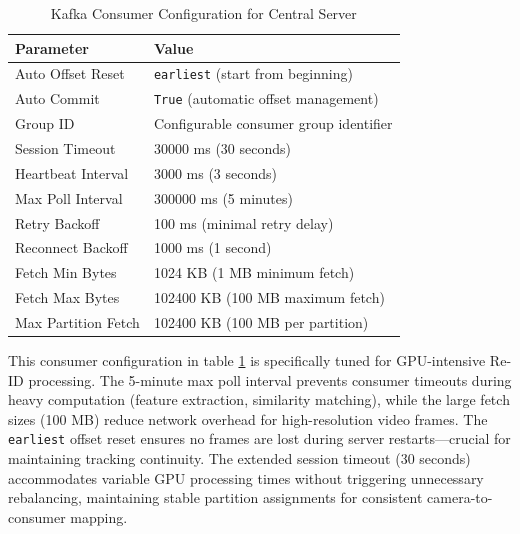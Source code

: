 \begin{table}[!htbp]
\centering
\caption{Kafka Consumer Configuration for Central Server}
\label{tab:consumer_config}
\begin{tabular}{|p{4cm}|p{8cm}|}
\hline
\textbf{Parameter} & \textbf{Value} \\
\hline
Auto Offset Reset & \texttt{earliest} (start from beginning) \\
Auto Commit & \texttt{True} (automatic offset management) \\
Group ID & Configurable consumer group identifier \\
Session Timeout & 30000 ms (30 seconds) \\
Heartbeat Interval & 3000 ms (3 seconds) \\
Max Poll Interval & 300000 ms (5 minutes) \\
Retry Backoff & 100 ms (minimal retry delay) \\
Reconnect Backoff & 1000 ms (1 second) \\
Fetch Min Bytes & 1024 KB (1 MB minimum fetch) \\
Fetch Max Bytes & 102400 KB (100 MB maximum fetch) \\
Max Partition Fetch & 102400 KB (100 MB per partition) \\
\hline
\end{tabular}
\end{table}

This consumer configuration in table \ref{tab:consumer_config} is specifically tuned for GPU-intensive Re-ID processing. The 5-minute max poll interval prevents consumer timeouts during heavy computation (feature extraction, similarity matching), while the large fetch sizes (100 MB) reduce network overhead for high-resolution video frames. The \texttt{earliest} offset reset ensures no frames are lost during server restarts—crucial for maintaining tracking continuity. The extended session timeout (30 seconds) accommodates variable GPU processing times without triggering unnecessary rebalancing, maintaining stable partition assignments for consistent camera-to-consumer mapping.